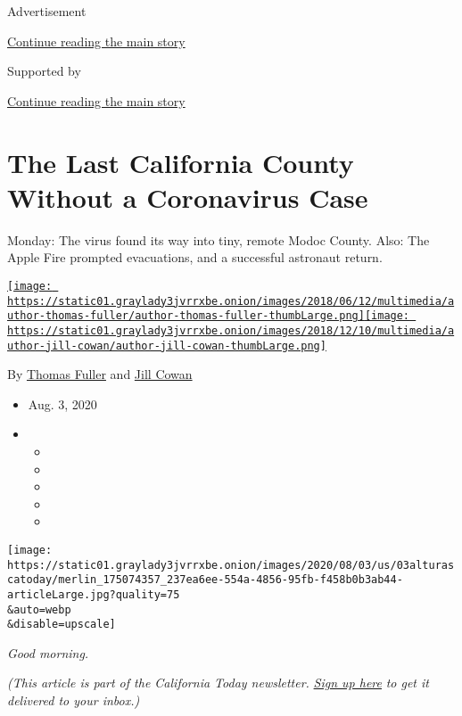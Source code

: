 Advertisement

\protect\hyperlink{after-top}{Continue reading the main story}

Supported by

\protect\hyperlink{after-sponsor}{Continue reading the main story}

\hypertarget{the-last-california-county-without-a-coronavirus-case}{%
\section{The Last California County Without a Coronavirus
Case}\label{the-last-california-county-without-a-coronavirus-case}}

Monday: The virus found its way into tiny, remote Modoc County. Also:
The Apple Fire prompted evacuations, and a successful astronaut return.

\href{https://www.nytimes3xbfgragh.onion/by/thomas-fuller}{\texttt{[image: https://static01.graylady3jvrrxbe.onion/images/2018/06/12/multimedia/author-thomas-fuller/author-thomas-fuller-thumbLarge.png]}}\href{https://www.nytimes3xbfgragh.onion/by/jill-cowan}{\texttt{[image: https://static01.graylady3jvrrxbe.onion/images/2018/12/10/multimedia/author-jill-cowan/author-jill-cowan-thumbLarge.png]}}

By \href{https://www.nytimes3xbfgragh.onion/by/thomas-fuller}{Thomas
Fuller} and \href{https://www.nytimes3xbfgragh.onion/by/jill-cowan}{Jill
Cowan}

\begin{itemize}
\item
  Aug. 3, 2020
\item
  \begin{itemize}
  \item
  \item
  \item
  \item
  \item
  \end{itemize}
\end{itemize}

\texttt{[image: https://static01.graylady3jvrrxbe.onion/images/2020/08/03/us/03alturascatoday/merlin\_175074357\_237ea6ee-554a-4856-95fb-f458b0b3ab44-articleLarge.jpg?quality=75\\\&auto=webp\\\&disable=upscale]}

\emph{Good morning.}

\emph{(This article is part of the California Today newsletter.}
\href{https://www.nytimes3xbfgragh.onion/newsletters/california-today}{\emph{Sign
up here}} \emph{to get it delivered to your inbox.)}

